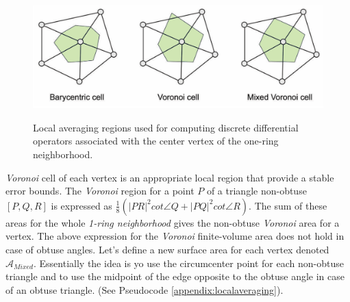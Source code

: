 \begin{figure}[!h]
    \centering
    \includegraphics[scale=0.35]{images/localregions.png}
    \label{fig:localregions}
    \caption{Local averaging regions used for computing discrete differential operators associated with the center vertex of the one-ring neighborhood. \cite{polygonmeshprocessing}}
\end{figure}
\textit{Voronoi} cell of each vertex is an appropriate local region that provide a stable error bounds.
The \textit{Voronoi} region for a point $P$ of a triangle non-obtuse $[P, Q, R]$ is expressed as $\frac{1}{8}(| PR|^2 cot \angle Q + |PQ |^2 cot \angle R)$. The sum of these areas for the whole \textit{1-ring neighborhood} gives the non-obtuse \textit{Voronoi} area for a vertex. The above expression for the \textit{Voronoi} finite-volume area does not hold in case of obtuse angles. Let's define a new surface area for each vertex denoted $\mathcal{A}_{Mixed}$. Essentially the idea is yo use the circumcenter point for each non-obtuse triangle and to use the midpoint of the edge opposite to the obtuse angle in case of an obtuse triangle. (See Pseudocode \ref{appendix:localaveraging}). \cite{meshlab}


